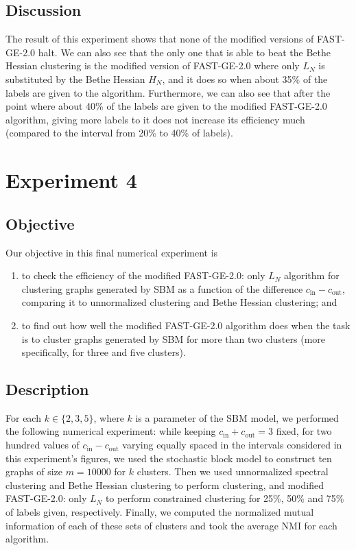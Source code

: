 \subsection*{Discussion}
The result of this experiment shows that none of the modified versions of FAST-GE-2.0 halt.
We can also see that the only one that is able to beat the Bethe Hessian clustering is the modified version of FAST-GE-2.0 where only $L_N$ is substituted by the Bethe Hessian $H_N$, and it does so when about 35\% of the labels are given to the algorithm.
Furthermore, we can also see that after the point where about 40\% of the labels are given to the modified FAST-GE-2.0 algorithm, giving more labels to it does not increase its efficiency much (compared to the interval from 20\% to 40\% of labels).


\section{Experiment 4}
\subsection*{Objective}
Our objective in this final numerical experiment is
\begin{enumerate}[(1)]
   \item to check the efficiency of the modified FAST-GE-2.0: only $L_N$ algorithm for clustering graphs generated by SBM as a function of the difference $c_\text{in} - c_\text{out}$, comparing it to unnormalized clustering and Bethe Hessian clustering; and
   \item to find out how well the modified FAST-GE-2.0 algorithm does when the task is to cluster graphs generated by SBM for more than two clusters (more specifically, for three and five clusters).
\end{enumerate}

\subsection*{Description}
For each $k \in \{ 2, 3, 5 \}$, where $k$ is a parameter of the SBM model, we performed the following numerical experiment: while keeping $c_\text{in} + c_\text{out} = 3$ fixed, for two hundred values of $c_\text{in} - c_\text{out}$ varying equally spaced in the intervals considered in this experiment's figures, we used the stochastic block model to construct ten graphs of size $m = 10000$ for $k$ clusters. Then we used unnormalized spectral clustering and Bethe Hessian clustering to perform clustering, and modified FAST-GE-2.0: only $L_N$ to perform constrained clustering for 25\%, 50\% and 75\% of labels given, respectively.
Finally, we computed the normalized mutual information of each of these sets of clusters and took the average NMI for each algorithm.


